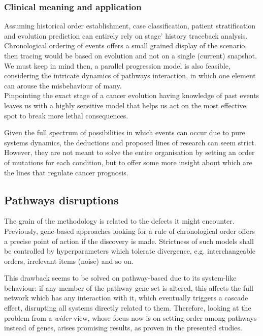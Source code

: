 \subsubsection{Clinical meaning and application}
Assuming historical order establishment, case classification, patient stratification and evolution prediction can entirely rely on stage’ history traceback analysis. Chronological ordering of events offers a small grained display of the scenario, then tracing would be based on evolution and not on a single (current) snapshot. We must keep in mind then, a parallel progression model \cite{Turajlic2016MetastasisProcess} is also feasible, considering the intricate dynamics of pathways interaction, in which one element can arouse the misbehaviour of many.
\\

Pinpointing the exact stage of a cancer evolution having knowledge of past events leaves us with a highly sensitive model that helps us act on the most effective spot to break more lethal consequences.

Given the full spectrum of possibilities in which events can occur due to pure systems dynamics, the deductions and proposed lines of research can seem strict. However, they are not meant to solve the entire organisation by setting an order of mutations for each condition, but to offer some more insight about which are the lines that regulate cancer prognosis.

\subsection{Pathways disruptions}
The grain of the methodology is related to the defects it might encounter. Previously, gene-based approaches looking for a rule of chronological order offers a precise point of action if the discovery is made. Strictness of such models shall be controlled by hyperparameters which tolerate divergence, e.g. interchangeable orders, irrelevant items (noise) and so on.

This drawback seems to be solved on pathway-based due to its system-like behaviour: if any member of the pathway gene set is altered, this affects the full network which has any interaction with it, which eventually triggers a cascade effect, disrupting all systems directly related to them. Therefore, looking at the problem from a \emph{wider} view, whose focus now is on setting order among pathways instead of genes, arises promising results, as proven in the presented studies.

